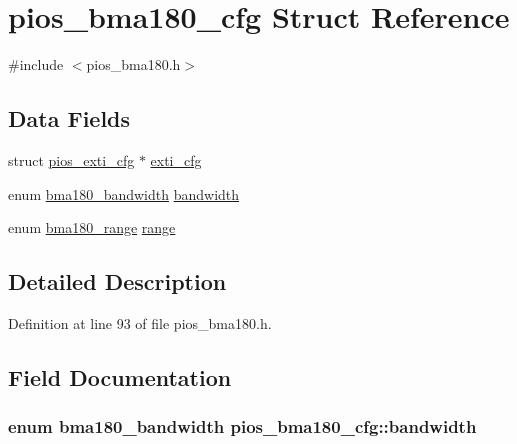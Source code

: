 \hypertarget{structpios__bma180__cfg}{\section{pios\-\_\-bma180\-\_\-cfg \-Struct \-Reference}
\label{structpios__bma180__cfg}
}


{\ttfamily \#include $<$pios\-\_\-bma180.\-h$>$}

\subsection*{\-Data \-Fields}
\begin{DoxyCompactItemize}
\item 
struct \hyperlink{structpios__exti__cfg}{pios\-\_\-exti\-\_\-cfg} $\ast$ \hyperlink{structpios__bma180__cfg_a1fc7acd142e861f02f5f8a5b9364bedf}{exti\-\_\-cfg}
\item 
enum \hyperlink{group___p_i_o_s___b_m_a180_gacd6d3ecff286f705778973637b4d3d99}{bma180\-\_\-bandwidth} \hyperlink{structpios__bma180__cfg_aff39543f8f282ae9daba6cb6e3500f7f}{bandwidth}
\item 
enum \hyperlink{group___p_i_o_s___b_m_a180_ga319b0b37d7184097d2ae4e7ba527a416}{bma180\-\_\-range} \hyperlink{structpios__bma180__cfg_ab6de89aba289da9930b188f183765921}{range}
\end{DoxyCompactItemize}


\subsection{\-Detailed \-Description}


\-Definition at line 93 of file pios\-\_\-bma180.\-h.



\subsection{\-Field \-Documentation}
\hypertarget{structpios__bma180__cfg_aff39543f8f282ae9daba6cb6e3500f7f}{
\subsubsection[{bandwidth}]{\setlength{\rightskip}{0pt plus 5cm}enum {\bf bma180\-\_\-bandwidth} {\bf pios\-\_\-bma180\-\_\-cfg\-::bandwidth}}}\label{structpios__bma180__cfg_aff39543f8f282ae9daba6cb6e3500f7f}


